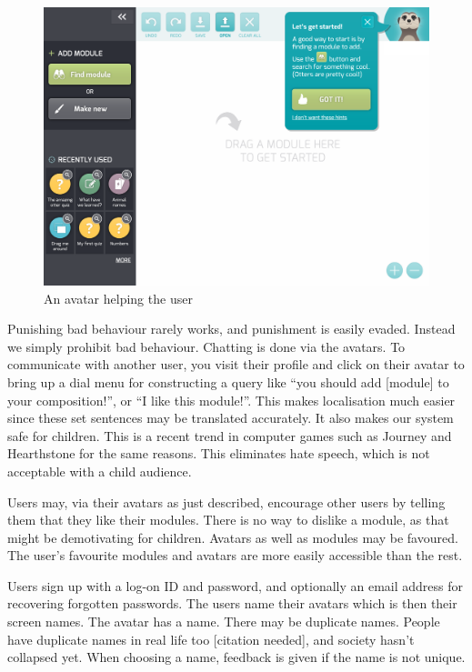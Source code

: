 \begin{figure}[H]
    \centering
    \begin{scale}{0.1}
        \includegraphics{fig/avatar.png}
    \end{scale}
    \caption{An avatar helping the user}
   \label{fig:avatar}
\end{figure}

Punishing bad behaviour rarely works, and punishment is easily evaded. Instead 
we simply prohibit bad behaviour. Chatting is done via the avatars. To 
communicate with another user, you visit their profile and click on their 
avatar to bring up a dial menu for constructing a query like ``you should add 
[module] to your composition!'', or ``I like this module!''. This makes 
localisation much easier since these set sentences may be translated 
accurately. It also makes our system safe for 
children\cite{sadler2012virtual}. This is a recent trend in computer games 
such as Journey and Hearthstone for the same reasons. This eliminates hate 
speech\cite{hearthstone}, which is not acceptable with a child audience.

Users may, via their avatars as just described, encourage other users by 
telling them that they like their modules. There is no way to dislike a 
module, as that might be demotivating for children. Avatars as well as modules 
may be favoured. The user's favourite modules and avatars are more easily 
accessible than the rest.

Users sign up with a log-on ID and password, and optionally an email address 
for recovering forgotten passwords. The users name their avatars which is then 
their screen names. The avatar has a name. There may be duplicate names. 
People have duplicate names in real life too [citation needed], and society 
hasn't collapsed yet. When choosing a name, feedback is given if the name is 
not unique.

